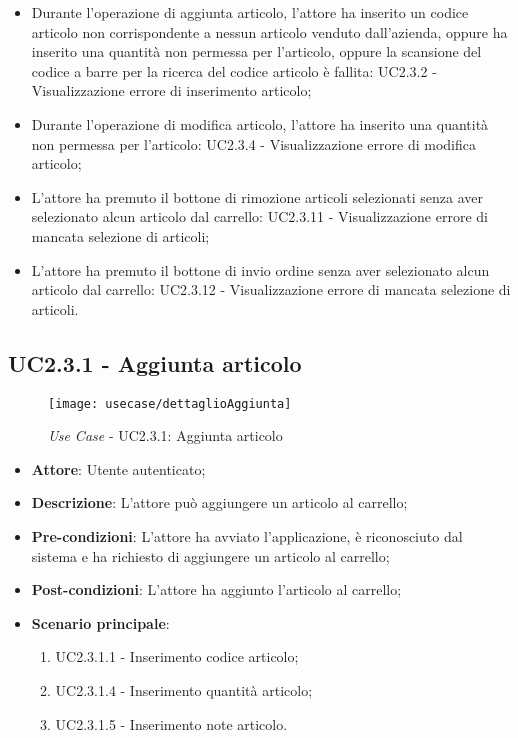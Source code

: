 \begin{itemize}
\begin{itemize}
			\item Durante l'operazione di aggiunta articolo, l'attore ha inserito un codice articolo non corrispondente a nessun articolo venduto dall'azienda, oppure ha inserito una quantità non permessa per l'articolo, oppure la scansione del codice a barre per la ricerca del codice articolo è fallita: UC2.3.2 - Visualizzazione errore di inserimento articolo;
			\item Durante l'operazione di modifica articolo, l'attore ha inserito una quantità non permessa per l'articolo: UC2.3.4 - Visualizzazione errore di modifica articolo;
			\item L'attore ha premuto il bottone di rimozione articoli selezionati senza aver selezionato alcun articolo dal carrello: UC2.3.11 - Visualizzazione errore di mancata selezione di articoli;
			\item L'attore ha premuto il bottone di invio ordine senza aver selezionato alcun articolo dal carrello: UC2.3.12 - Visualizzazione errore di mancata selezione di articoli.
		\end{itemize}
\end{itemize}

\newpage

\subsection{UC2.3.1 - Aggiunta articolo}

\begin{figure}[!h] 
    \centering 
    \texttt{[image: usecase/dettaglioAggiunta]} 
    \caption{\textit{Use Case} - UC2.3.1: Aggiunta articolo}
\end{figure}

\begin{itemize}
	\item \textbf{Attore}: Utente autenticato;
	\item \textbf{Descrizione}: L'attore può aggiungere un articolo al carrello;
	\item \textbf{Pre-condizioni}: L'attore ha avviato l'applicazione, è riconosciuto dal sistema e ha richiesto di aggiungere un articolo al carrello;
	\item \textbf{Post-condizioni}: L'attore ha aggiunto l'articolo al carrello;
	\item \textbf{Scenario principale}:
		\begin{enumerate}
			\item UC2.3.1.1 - Inserimento codice articolo;
			\item UC2.3.1.4 - Inserimento quantità articolo;
			\item UC2.3.1.5 - Inserimento note articolo.
		\end{enumerate}
\end{itemize}

